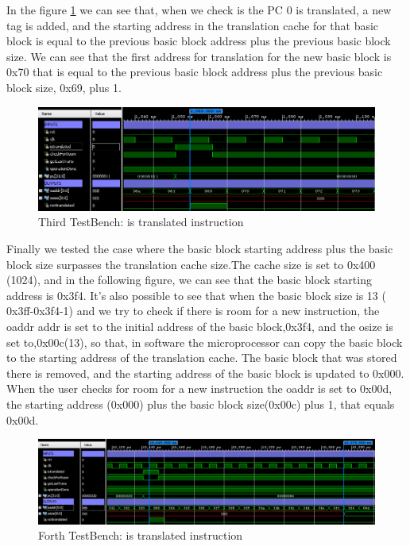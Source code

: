 In the figure \ref{fig:TestBench2} we can see that, when we check is the PC 0 is translated, a new tag is added, and the starting address in the translation cache for that basic block is equal to the previous basic block address plus the previous basic block size. We can see that the first address for translation for the new basic block is 0x70 that is equal to the previous basic block address plus the previous basic block size, 0x69, plus 1.

\begin{figure} [H]
	\centering
	\includegraphics[scale = 0.5]{images/TestBench2.png}
	\caption{Third TestBench: is translated instruction}
	\label{fig:TestBench2}
\end{figure}

Finally we tested the case where the basic block starting address plus the basic block size surpasses the translation cache size.The cache size is set to 0x400 (1024), and in the following figure, we can see that the basic block starting address is 0x3f4. It's also possible to see that when the basic block size is 13 ( 0x3ff-0x3f4-1) and we try to check if there is room for a new instruction, the oaddr addr is set to the initial address of the basic block,0x3f4, and the osize is set to,0x00c(13), so that, in software the microprocessor can copy the basic block to the starting address of the translation cache. The basic block that was stored there is removed, and the starting address of the basic block is updated to 0x000. When the user checks for room for a new instruction the oaddr is set to 0x00d, the starting address (0x000) plus the basic block size(0x00c) plus 1, that equals 0x00d.

\begin{figure} [H]
	\centering
	\includegraphics[scale = 0.5]{images/TestBench3.png}
	\caption{Forth TestBench: is translated instruction}
	\label{fig:TestBench3}
\end{figure}